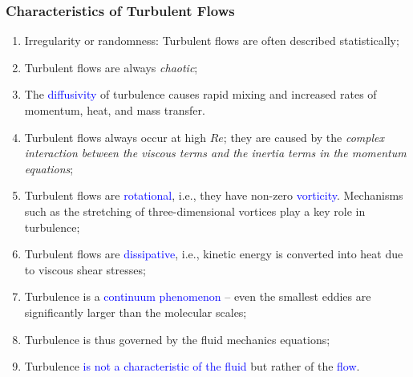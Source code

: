 \documentclass[10pt,compress]{beamer}
\newcommand{\blue}{\textcolor{blue}}
\begin{document}
\begin{frame}
 \frametitle{Characteristics of Turbulent Flows}
   \begin{enumerate}
      \item<1-> Irregularity or randomness: Turbulent flows are often described statistically;
      \item<1-> Turbulent flows are always {\it chaotic};
      \item<1-> The \blue{diffusivity} of turbulence causes rapid mixing and increased rates of momentum, heat, and mass transfer. %
      \item<1-> Turbulent flows always occur at high $Re$; they are caused by the {\it complex interaction between the viscous terms and the inertia terms in the momentum equations};
      \item<1-> Turbulent flows are \blue{rotational}, i.e., they have non-zero \blue{vorticity}. Mechanisms such as the stretching of three-dimensional vortices play a key role in turbulence;
      \item<2-> Turbulent flows are \blue{dissipative}, i.e., kinetic energy is converted into heat due to viscous shear stresses; %
      \item<2-> Turbulence is a \blue{continuum phenomenon} -- even the smallest eddies are significantly larger than the molecular scales; 
      \item<2-> Turbulence is thus governed by the fluid mechanics equations;
      \item<2-> Turbulence \blue{is not a characteristic of the fluid} but rather of the \blue{flow}.
   \end{enumerate}
\end{frame}
\end{document}
